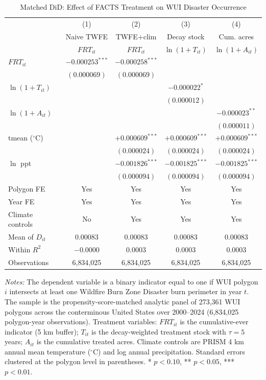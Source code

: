 \documentclass[12pt, letterpaper]{article}
\begin{document}
\begin{table}[H]
\centering
\small
\begin{threeparttable}
\caption{Matched DiD: Effect of FACTS Treatment on WUI Disaster Occurrence}
\label{tab:main}
\begin{tabular}{lcccc}
\toprule
& (1) & (2) & (3) & (4) \\
& Naive TWFE & TWFE+clim & Decay stock & Cum. acres \\
& $FRT_{it}$ & $FRT_{it}$ & $\ln(1+T_{it})$ & $\ln(1+A_{it})$ \\
\midrule
$FRT_{it}$ & $-0.000253^{***}$ & $-0.000258^{***}$ & & \\
& $(0.000069)$ & $(0.000069)$ & & \\
$\ln(1+T_{it})$ & & & $-0.000022^{*}$ & \\
& & & $(0.000012)$ & \\
$\ln(1+A_{it})$ & & & & $-0.000023^{**}$ \\
& & & & $(0.000011)$ \\
tmean ($^\circ$C) & & $+0.000609^{***}$ & $+0.000609^{***}$ & $+0.000609^{***}$ \\
& & $(0.000024)$ & $(0.000024)$ & $(0.000024)$ \\
$\ln$ ppt & & $-0.001826^{***}$ & $-0.001825^{***}$ & $-0.001825^{***}$ \\
& & $(0.000094)$ & $(0.000094)$ & $(0.000094)$ \\
\midrule
Polygon FE & Yes & Yes & Yes & Yes \\
Year FE & Yes & Yes & Yes & Yes \\
Climate controls & No & Yes & Yes & Yes \\
\midrule
Mean of $D_{it}$ & 0.00083 & 0.00083 & 0.00083 & 0.00083 \\
Within $R^2$ & $-0.0000$ & $0.0003$ & $0.0003$ & $0.0003$ \\
Observations & 6{,}834{,}025 & 6{,}834{,}025 & 6{,}834{,}025 & 6{,}834{,}025 \\
\bottomrule
\end{tabular}
\begin{tablenotes}
\small
\item \textit{Notes:} The dependent variable is a binary indicator equal to one if WUI polygon $i$ intersects at least one Wildfire Burn Zone Disaster burn perimeter in year $t$. The sample is the propensity-score-matched analytic panel of 273{,}361 WUI polygons across the conterminous United States over 2000--2024 (6{,}834{,}025 polygon-year observations). Treatment variables: $FRT_{it}$ is the cumulative-ever indicator (5 km buffer); $T_{it}$ is the decay-weighted treatment stock with $\tau = 5$ years; $A_{it}$ is the cumulative treated acres. Climate controls are PRISM 4 km annual mean temperature ($^\circ$C) and log annual precipitation. Standard errors clustered at the polygon level in parentheses. * $p<0.10$, ** $p<0.05$, *** $p<0.01$.
\end{tablenotes}
\end{threeparttable}
\end{table}
\end{document}
